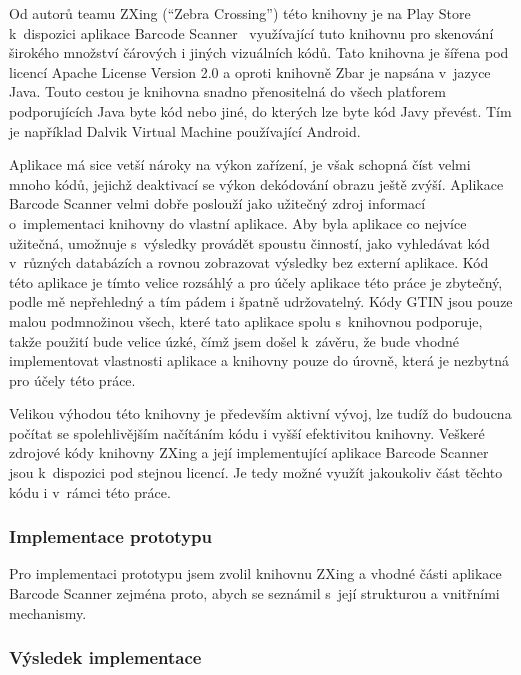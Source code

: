 \documentclass[thesis=B,czech]{FITthesis}[2013/10/20]
\begin{document}
Od autorů teamu ZXing (``Zebra Crossing'') této knihovny je na Play Store k~dispozici aplikace Barcode Scanner~\cite{barcode_scanner} využívající tuto knihovnu pro skenování širokého množství čárových i jiných vizuálních kódů. Tato knihovna je šířena pod licencí Apache License Version 2.0 a oproti knihovně Zbar je napsána v~jazyce Java. Touto cestou je knihovna snadno přenositelná do všech platforem podporujících Java byte kód nebo jiné, do kterých lze byte kód Javy převést. Tím je například Dalvik Virtual Machine používající Android.

Aplikace má sice vetší nároky na výkon zařízení, je však schopná číst velmi mnoho kódů, jejichž deaktivací se výkon dekódování obrazu ještě zvýší. Aplikace Barcode Scanner velmi dobře poslouží jako užitečný zdroj informací o~implementaci knihovny do vlastní aplikace. Aby byla aplikace co nejvíce užitečná, umožnuje s~výsledky provádět spoustu činností, jako vyhledávat kód v~různých databázích a rovnou zobrazovat výsledky bez externí aplikace. Kód této aplikace je tímto velice rozsáhlý a pro účely aplikace této práce je zbytečný, podle mě nepřehledný a tím pádem i špatně udržovatelný. Kódy GTIN jsou pouze malou podmnožinou všech, které tato aplikace spolu s~knihovnou podporuje, takže použití bude velice úzké, čímž jsem došel k~závěru, že bude vhodné implementovat vlastnosti aplikace a knihovny pouze do úrovně, která je nezbytná pro účely této práce.

Velikou výhodou této knihovny je především aktivní vývoj, lze tudíž do budoucna počítat se spolehlivějším načítáním kódu i vyšší efektivitou knihovny. Veškeré zdrojové kódy knihovny ZXing a její implementující aplikace Barcode Scanner jsou k~dispozici pod stejnou licencí. Je tedy možné využít jakoukoliv část těchto kódu i v~rámci této práce. 

\subsubsection{Implementace prototypu}

Pro implementaci prototypu jsem zvolil knihovnu ZXing a vhodné části aplikace Barcode Scanner zejména proto, abych se seznámil s~její strukturou a vnitřními mechanismy. 

\subsubsection{Výsledek implementace}
\end{document}
